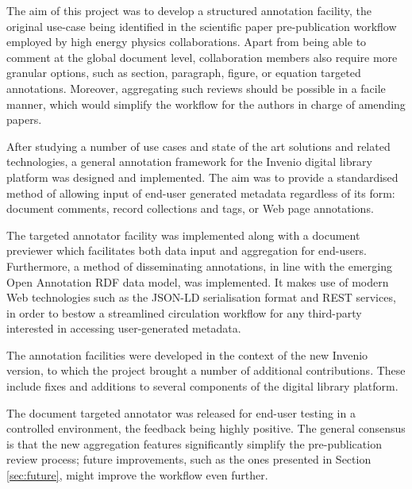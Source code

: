 
The aim of this project was to develop a structured annotation facility, the
original use-case being identified in the scientific paper pre-publication
workflow employed by high energy physics collaborations. Apart from being able
to comment at the global document level, collaboration members also require
more granular options, such as section, paragraph, figure, or equation targeted
annotations.  Moreover, aggregating such reviews should be possible in a facile
manner, which would simplify the workflow for the authors in charge of amending
papers.

After studying a number of use cases and state of the art solutions and related
technologies, a general annotation framework for the Invenio digital library
platform was designed and implemented. The aim was to provide a standardised
method of allowing input of end-user generated metadata regardless of its form:
document comments, record collections and tags, or Web page annotations.

The targeted annotator facility was implemented along with a document
previewer which facilitates both data input and aggregation for end-users.
Furthermore, a method of disseminating annotations, in line with the emerging
Open Annotation RDF data model, was implemented. It makes use of modern Web
technologies such as the JSON-LD serialisation format and REST services, in
order to bestow a streamlined circulation workflow for any third-party
interested in accessing user-generated metadata.

The annotation facilities were developed in the context of the new Invenio
version, to which the project brought a number of additional contributions.
These include fixes and additions to several components of the digital library
platform.

The document targeted annotator was released for end-user testing in a
controlled environment, the feedback being highly positive. The general
consensus is that the new aggregation features significantly simplify the
pre-publication review process; future improvements, such as the ones presented
in Section \ref{sec:future}, might improve the workflow even further.
